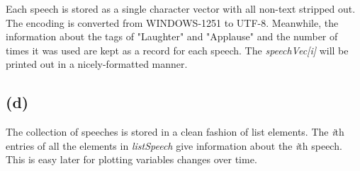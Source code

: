 \documentclass{article}
\begin{document}
Each speech is stored as a single character vector with all non-text stripped out. The encoding is converted from
WINDOWS-1251 to UTF-8.
Meanwhile, the information about the tags of "Laughter" and "Applause" and the number of times it was used
are kept as a record for each speech. The \textit{speechVec[i]} will be printed out in a nicely-formatted manner. 



\subsection*{(d)}

The collection of speeches is stored in a clean fashion of list elements. The \textit{i}th entries of all the elements
in \textit{listSpeech} give information about the \textit{i}th speech. 
This is easy later for plotting variables changes over time.

\end{document}
